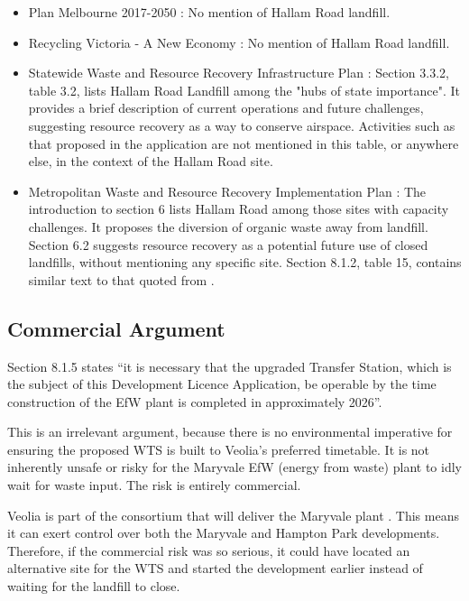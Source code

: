 \documentclass[12pt]{article}
\begin{document}
\begin{itemize}
  \item Plan Melbourne 2017-2050 \cite{planmelb}: No mention of Hallam Road landfill.
  \item Recycling Victoria - A New Economy \cite{recyclingvic}: No mention of Hallam Road landfill.
  \item Statewide Waste and Resource Recovery Infrastructure Plan \cite{swrrip}: Section 3.3.2, table 3.2, lists Hallam Road Landfill among the "hubs of state importance". It provides a brief description of current operations and future challenges, suggesting resource recovery as a way to conserve airspace. Activities such as that proposed in the application are not mentioned in this table, or anywhere else, in the context of the Hallam Road site.
  \item Metropolitan Waste and Resource Recovery Implementation Plan \cite{mwrrip}: The introduction to section 6 lists Hallam Road among those sites with capacity challenges. It proposes the diversion of organic waste away from landfill. Section 6.2 suggests resource recovery as a potential future use of closed landfills, without mentioning any specific site. Section 8.1.2, table 15, contains similar text to that quoted from \cite{swrrip}.
\end{itemize}

\subsection{Commercial Argument}

Section 8.1.5 states “it is necessary that the upgraded Transfer Station, which is the subject of this Development Licence Application, be operable by the time construction of the EfW plant is completed in approximately 2026”.

This is an irrelevant argument, because there is no environmental imperative for ensuring the proposed WTS is built to Veolia's preferred timetable. It is not inherently unsafe or risky for the Maryvale EfW (energy from waste) plant to idly wait for waste input. The risk is entirely commercial. 

Veolia is part of the consortium that will deliver the Maryvale plant \cite{maryvaleefw}. This means it can exert control over both the Maryvale and Hampton Park developments. Therefore, if the commercial risk was so serious, it could have located an alternative site for the WTS and started the development earlier instead of waiting for the landfill to close.
\end{document}
